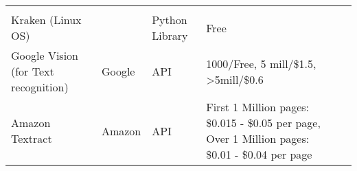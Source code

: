 \documentclass[
]{article}
\begin{document}
\begin{longtable}[]{@{}lllll@{}}
\begin{minipage}[t]{0.18\columnwidth}
\strut
\end{minipage}\tabularnewline
\begin{minipage}[t]{0.37\columnwidth}\raggedright
Kraken (Linux OS)\strut
\end{minipage} & \begin{minipage}[t]{0.09\columnwidth}\raggedright
\strut
\end{minipage} & \begin{minipage}[t]{0.14\columnwidth}\raggedright
Python Library\strut
\end{minipage} & \begin{minipage}[t]{0.07\columnwidth}\raggedright
Free\strut
\end{minipage} & \begin{minipage}[t]{0.18\columnwidth}\raggedright
\strut
\end{minipage}\tabularnewline
\begin{minipage}[t]{0.37\columnwidth}\raggedright
Google Vision (for Text recognition)\strut
\end{minipage} & \begin{minipage}[t]{0.09\columnwidth}\raggedright
Google\strut
\end{minipage} & \begin{minipage}[t]{0.14\columnwidth}\raggedright
API\strut
\end{minipage} & \begin{minipage}[t]{0.07\columnwidth}\raggedright
1000/Free, 5 mill/\$1.5, \textgreater5mill/\$0.6\strut
\end{minipage} & \begin{minipage}[t]{0.18\columnwidth}\raggedright
\strut
\end{minipage}\tabularnewline
\begin{minipage}[t]{0.37\columnwidth}\raggedright
Amazon Textract\strut
\end{minipage} & \begin{minipage}[t]{0.09\columnwidth}\raggedright
Amazon\strut
\end{minipage} & \begin{minipage}[t]{0.14\columnwidth}\raggedright
API\strut
\end{minipage} & \begin{minipage}[t]{0.07\columnwidth}\raggedright
First 1 Million pages: \$0.015 - \$0.05 per page, Over 1 Million pages:
\$0.01 - \$0.04 per page\strut
\end{minipage} & \begin{minipage}[t]{0.18\columnwidth}\raggedright
\strut

\end{minipage}
\end{longtable}
\end{document}
